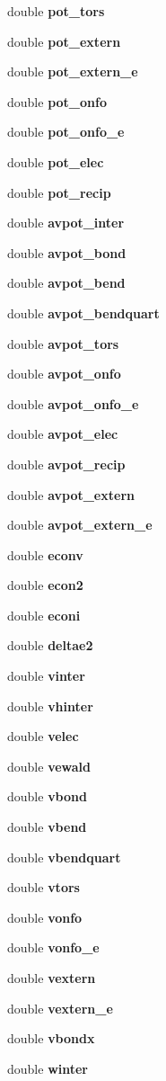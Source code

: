 \begin{CompactItemize}
\item 
double {\bf pot\_\-tors}
\item 
double {\bf pot\_\-extern}
\item 
double {\bf pot\_\-extern\_\-e}
\item 
double {\bf pot\_\-onfo}
\item 
double {\bf pot\_\-onfo\_\-e}
\item 
double {\bf pot\_\-elec}
\item 
double {\bf pot\_\-recip}
\item 
double {\bf avpot\_\-inter}
\item 
double {\bf avpot\_\-bond}
\item 
double {\bf avpot\_\-bend}
\item 
double {\bf avpot\_\-bendquart}
\item 
double {\bf avpot\_\-tors}
\item 
double {\bf avpot\_\-onfo}
\item 
double {\bf avpot\_\-onfo\_\-e}
\item 
double {\bf avpot\_\-elec}
\item 
double {\bf avpot\_\-recip}
\item 
double {\bf avpot\_\-extern}
\item 
double {\bf avpot\_\-extern\_\-e}
\item 
double {\bf econv}
\item 
double {\bf econ2}
\item 
double {\bf econi}
\item 
double {\bf deltae2}
\item 
double {\bf vinter}
\item 
double {\bf vhinter}
\item 
double {\bf velec}
\item 
double {\bf vewald}
\item 
double {\bf vbond}
\item 
double {\bf vbend}
\item 
double {\bf vbendquart}
\item 
double {\bf vtors}
\item 
double {\bf vonfo}
\item 
double {\bf vonfo\_\-e}
\item 
double {\bf vextern}
\item 
double {\bf vextern\_\-e}
\item 
double {\bf vbondx}
\item 
double {\bf winter}
\item 

\end{CompactItemize}
